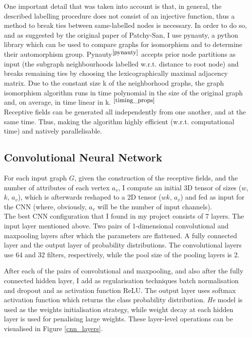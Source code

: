 One important detail that was taken into account is that, in general, the described labelling procedure does not consist of an injective function, thus a method to break ties between same-labelled nodes is necessary. In order to do so, and as suggested by the original paper of Patchy-San, I use pynauty, a python library which can be used to compare graphs for isomorphism and to determine their automorphism group. Pynauty$^{\small \cite{pynauty}}$ accepts prior node partitions as input (the subgraph neighbourhoods labelled w.r.t. distance to root node) and breaks remaining ties by choosing the lexicographically maximal adjacency matrix. Due to the constant size k of the neighborhood graphs, the graph isomorphism algorithm runs in time polynomial in the size of the original graph and, on average, in time linear in k. $^{\small \cite{timing_props}}$ \\

Receptive fields can be generated all independently from one another, and at the same time. Thus, making the algorithm highly efficient (w.r.t. computational time) and natively parallelisable. 

\subsection{Convolutional Neural Network}

For each input graph $G$, given the construction of the receptive fields, and the number of attributes of each vertex $a_v$, I compute an initial 3D tensor of sizes ($w$, $k$, $a_v$), which is afterwards reshaped to a 2D tensor ($wk$, $a_v$) and fed as input for the CNN (where, obviously, $a_v$ will be the number of input channels). \\

The best CNN configuration that I found in my project consists of 7 layers. The input layer mentioned above. Two pairs of 1-dimensional convolutional and maxpooling layers after which the parameters are flattened. A fully connected layer and the output layer of probability distributions. The convolutional layers use 64 and 32 filters, respectively, while the pool size of the pooling layers is 2. \smallskip

After each of the pairs of convolutional and maxpooling, and also after the fully connected hidden layer, I add as regularisation techniques batch normalisation and dropout and as activation function ReLU. The output layer uses softmax activation function which returns the class probability distribution. \textit{He} model is used as the weights initialisation strategy, while weight decay at each hidden layer is used for penalising large weights. These layer-level operations can be visualised in Figure \ref{cnn_layers}. 

